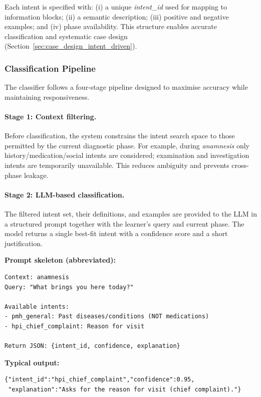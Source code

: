 Each intent is specified with: (i) a unique \textit{intent\_id} used for
mapping to information blocks; (ii) a semantic description; (iii) positive and
negative examples; and (iv) phase availability. This structure enables accurate
classification and systematic case design (Section~\ref{sec:case_design_intent_driven}).

\subsubsection{Classification Pipeline}

The classifier follows a four-stage pipeline designed to maximise accuracy while
maintaining responsiveness.

\paragraph{Stage 1: Context filtering.}
Before classification, the system constrains the intent search space to those
permitted by the current diagnostic phase. For example, during \textit{anamnesis}
only history/medication/social intents are considered; examination and investigation
intents are temporarily unavailable. This reduces ambiguity and prevents
cross-phase leakage.

\paragraph{Stage 2: LLM-based classification.}
The filtered intent set, their definitions, and examples are provided to the LLM
in a structured prompt together with the learner’s query and current phase.
The model returns a single best-fit intent with a confidence score and a short
justification.

\noindent\textbf{Prompt skeleton (abbreviated):}
\begin{verbatim}
Context: anamnesis
Query: "What brings you here today?"

Available intents:
- pmh_general: Past diseases/conditions (NOT medications)
- hpi_chief_complaint: Reason for visit

Return JSON: {intent_id, confidence, explanation}
\end{verbatim}

\noindent\textbf{Typical output:}
\begin{verbatim}
{"intent_id":"hpi_chief_complaint","confidence":0.95,
 "explanation":"Asks for the reason for visit (chief complaint)."}
\end{verbatim}

